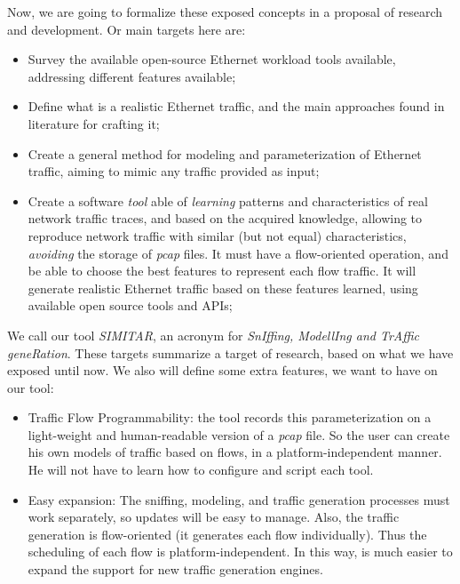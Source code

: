 Now, we are going to formalize these exposed concepts in a proposal of research and development. Or main targets here are:

\begin{itemize}


\item Survey the available open-source Ethernet workload tools available, addressing different features available;


\item Define what is a realistic Ethernet traffic, and the main approaches found in literature for crafting it;


\item Create a general method for modeling and parameterization of Ethernet traffic, aiming to mimic any traffic provided as input;


\item Create a software \textit{tool} able of \textit{learning} patterns and characteristics of real network traffic traces, and based on the acquired knowledge, allowing to reproduce network traffic with similar (but not equal) characteristics, \textit{avoiding} the storage of \textit{pcap} files. It must have a flow-oriented operation, and be able to choose the best features to represent each flow traffic. It will generate realistic Ethernet traffic based on these features learned, using available open source tools and APIs;


\end{itemize}


We call our  tool \textit{SIMITAR}, an acronym for \textit{SnIffing, ModellIng and TrAffic geneRation}.  These targets summarize a target of research, based on what we have exposed until now. We also will define some extra features, we want to have on our tool:

\begin{itemize}


\item Traffic Flow Programmability: the tool records this parameterization on a light-weight and human-readable version of a \textit{pcap} file. So the user can create his own models of traffic based on flows, in a platform-independent manner. He will not have to learn how to configure and script each tool.


\item Easy expansion: The sniffing, modeling, and traffic generation processes must work separately, so updates will be easy to manage. Also, the traffic generation is flow-oriented (it generates each flow individually). Thus the scheduling of each flow is platform-independent. In this way, is much easier to expand the support for new traffic generation engines.

\end{itemize}


